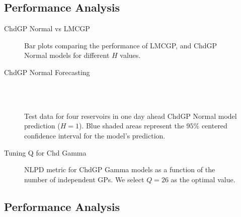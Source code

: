 \subsection{Performance Analysis}
\begin{frame}{ChdGP Normal vs LMCGP}
	\begin{figure}[htbp]
		\centering
		\setlength{}
		\setlength{}
		
		\subfloat[NLPD]{}
		\hfill
		\subfloat[MSLL]{}
		
		\caption{Bar plots comparing the performance of LMCGP, and ChdGP Normal models for different \(H\) values.}
	\end{figure}
\end{frame}

\begin{frame}{ChdGP Normal Forecasting}
	\justifying
	\begin{figure}[htbp]
		\setlength{} 
		\setlength{}
		
		\subfloat[$T.$]{}\hfill
		\subfloat[$A.$]{}\\[-0.5cm]
		\subfloat[$I.$]{}\hfill
		\subfloat[$O.$]{}\\[-0.4cm]
		
		\caption{Test data for four reservoirs in one day ahead ChdGP Normal model prediction ($H=1$). Blue shaded areas represent the $95\%$ centered confidence interval for the model's prediction.}
	\end{figure}
\end{frame}

\begin{frame}{Tuning Q for Chd Gamma}
	\begin{figure}[htbp]
		\centering
		\setlength\figurewidth{\columnwidth} 
		\setlength{}
		
		\caption{NLPD metric for ChdGP Gamma models as a function of the number of independent GPs. We select $Q = 26$ as the optimal value.}
	\end{figure}
\end{frame}

\subsection{Performance Analysis}

